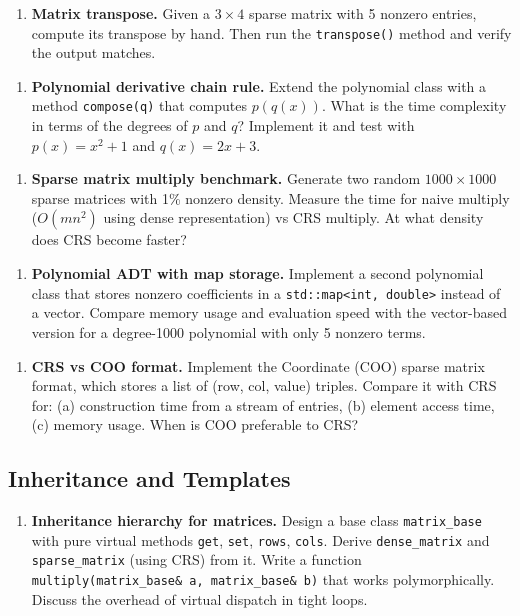 \begin{enumerate}
\item \textbf{Matrix transpose.} Given a $3 \times 4$ sparse matrix with 5 nonzero entries, compute its transpose by hand. Then run the \texttt{transpose()} method and verify the output matches.
\end{enumerate}

\begin{enumerate}
\item \textbf{Polynomial derivative chain rule.} Extend the polynomial class with a method \texttt{compose(q)} that computes $p(q(x))$. What is the time complexity in terms of the degrees of $p$ and $q$? Implement it and test with $p(x) = x^{2} + 1$ and $q(x) = 2x + 3$.
\end{enumerate}

\begin{enumerate}
\item \textbf{Sparse matrix multiply benchmark.} Generate two random $1000 \times 1000$ sparse matrices with 1\% nonzero density. Measure the time for naive multiply ($O(mn^{2})$ using dense representation) vs CRS multiply. At what density does CRS become faster?
\end{enumerate}

\begin{enumerate}
\item \textbf{Polynomial ADT with map storage.} Implement a second polynomial class that stores nonzero coefficients in a \texttt{std::map<int, double>} instead of a vector. Compare memory usage and evaluation speed with the vector-based version for a degree-1000 polynomial with only 5 nonzero terms.
\end{enumerate}

\begin{enumerate}
\item \textbf{CRS vs COO format.} Implement the Coordinate (COO) sparse matrix format, which stores a list of (row, col, value) triples. Compare it with CRS for: (a) construction time from a stream of entries, (b) element access time, (c) memory usage. When is COO preferable to CRS?
\end{enumerate}

\subsection{Inheritance and Templates}

\begin{enumerate}
\item \textbf{Inheritance hierarchy for matrices.} Design a base class \texttt{matrix\_base} with pure virtual methods \texttt{get}, \texttt{set}, \texttt{rows}, \texttt{cols}. Derive \texttt{dense\_matrix} and \texttt{sparse\_matrix} (using CRS) from it. Write a function \texttt{multiply(matrix\_base\& a, matrix\_base\& b)} that works polymorphically. Discuss the overhead of virtual dispatch in tight loops.
\end{enumerate}

